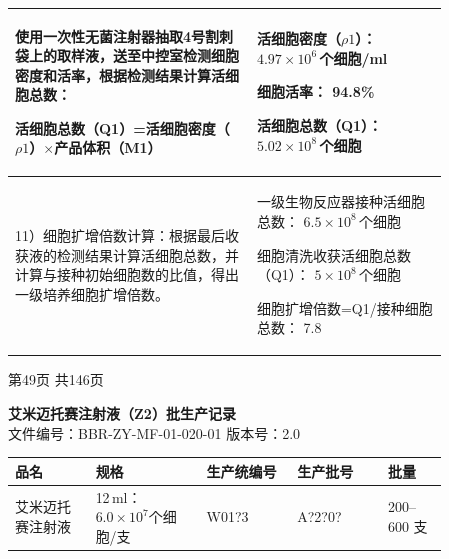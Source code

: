 \documentclass[UTF8,10pt,a4paper,fontset=fandol]{ctexart}
\newcommand{\fieldvalue}[1]{#1}
\newcommand{\handwritten}[1]{#1}
\begin{document}
\begin{tabular}{|p{0.48\linewidth}|p{0.38\linewidth}|}
\begin{minipage}[t]{0.46\linewidth}
使用一次性无菌注射器抽取4号割刺袋上的取样液，送至中控室检测细胞密度和活率，根据检测结果计算活细胞总数：

活细胞总数（Q1）=活细胞密度（$\rho1$）$\times$产品体积（M1）
\end{minipage}
&
活细胞密度（$\rho1$）：
\fieldvalue{\handwritten{$4.97\times10^{6}$}}\,个细胞/ml

细胞活率：
\fieldvalue{\handwritten{94.8}}\%

活细胞总数（Q1）：
\fieldvalue{\handwritten{$5.02\times10^{8}$}}\,个细胞 \\
\hline
\begin{minipage}[t]{0.46\linewidth}
11）细胞扩增倍数计算：根据最后收获液的检测结果计算活细胞总数，并计算与接种初始细胞数的比值，得出一级培养细胞扩增倍数。
\end{minipage}
&
一级生物反应器接种活细胞总数：
\fieldvalue{\handwritten{$6.5\times10^{8}$}}\,个细胞

细胞清洗收获活细胞总数（Q1）：
\fieldvalue{\handwritten{$5\times10^{8}$}}\,个细胞

细胞扩增倍数=Q1/接种细胞总数：
\fieldvalue{\handwritten{7.8}} \\
\hline
\end{tabular}

\begin{center}
第49页 共146页
\end{center}

\newpage

\begin{center}
\textbf{艾米迈托赛注射液（Z2）批生产记录}\\
文件编号：BBR-ZY-MF-01-020-01 \quad 版本号：2.0
\end{center}

\begin{center}
\begin{tabular}{|p{0.16\linewidth}|p{0.22\linewidth}|p{0.18\linewidth}|p{0.18\linewidth}|p{0.12\linewidth}|}
\hline
品名 & 规格 & 生产统编号 & 生产批号 & 批量 \\
\hline
艾米迈托赛注射液 &
12\,ml：$6.0\times10^{7}$个细胞/支 &
\fieldvalue{\handwritten{W01?3}} &
\fieldvalue{\handwritten{A?2?0?}} &
200--600 支 \\
\hline
\end{tabular}
\end{center}
\end{document}
